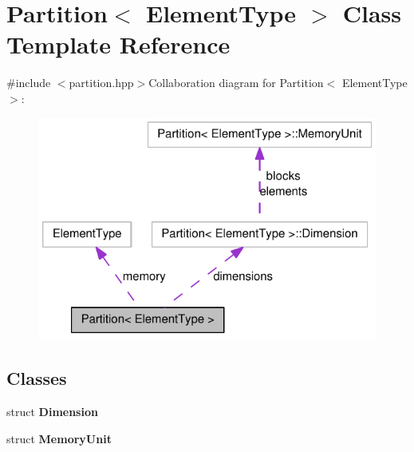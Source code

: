 \hypertarget{class_partition}{
\section{Partition$<$ ElementType $>$ Class Template Reference}
\label{class_partition}
}


{\ttfamily \#include $<$partition.hpp$>$}Collaboration diagram for Partition$<$ ElementType $>$:\nopagebreak
\begin{figure}[H]
\begin{center}
\leavevmode
\includegraphics[width=320pt]{class_partition__coll__graph}
\end{center}
\end{figure}
\subsection*{Classes}
\begin{DoxyCompactItemize}
\item 
struct {\bfseries Dimension}
\item 
struct {\bfseries MemoryUnit}
\end{DoxyCompactItemize}
